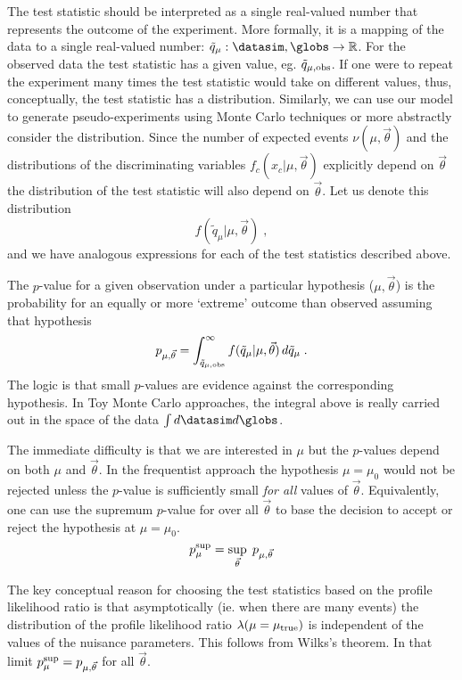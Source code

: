 The test statistic should be interpreted as a single real-valued number that represents the outcome of the experiment.  More formally, it is a mapping of the data to a single real-valued number:  \mbox{$\tilde{q}_\mu: \datasim,\globs \rightarrow \mathbb{R}$}.  For the observed data the test statistic has a given value, eg. $\tilde{q}_{\mu,\rm obs}$.  If one were to repeat the experiment many times the test statistic would take on different values, thus, conceptually, the test statistic has a distribution.  Similarly, we can use our model to generate pseudo-experiments using Monte Carlo techniques or more abstractly consider the distribution.  Since the number of expected events $\nu(\mu,\vec\theta)$ and the distributions of the discriminating variables $f_c(x_c|\mu,\vec\theta)$ explicitly depend on $\vec\theta$ the distribution of the test statistic will also depend on $\vec\theta$.  Let us denote this distribution 
\begin{equation}
f(\tilde{q}_\mu | \mu, \vec\theta) \;,
\end{equation}
and we have analogous expressions for each of the test statistics described above.


The $p$-value for a given observation under a particular hypothesis ($\mu,\vec\theta$) is the probability for an equally or more `extreme' outcome than observed assuming that hypothesis 
\begin{equation}
p_{\mu,\vec\theta} = \int_{\tilde{q}_{\mu,\rm obs}}^\infty f(\tilde{q}_\mu | \mu, \vec\theta) \, d\tilde{q}_\mu\;.
\end{equation}
The logic is that small $p$-values are evidence against the corresponding hypothesis.  In Toy Monte Carlo approaches, the integral above is really carried out in the space of the data $\int d\datasim  d\globs$.


The immediate difficulty is that we are interested in $\mu$ but the $p$-values depend on both $\mu$ and $\vec\theta$.  In the frequentist approach the hypothesis $\mu=\mu_0$ would not be rejected unless the $p$-value is sufficiently small \textit{for all} values of $\vec\theta$.  Equivalently, one can use the supremum $p$-value for over all $\vec\theta$ to base the decision to accept or reject the hypothesis at $\mu=\mu_0$.
\begin{equation}
p^{\rm sup}_{\mu} = \sup_{\vec\theta}\; p_{\mu,\vec\theta} 
\end{equation}


The key conceptual reason for choosing the test statistics based on the profile likelihood ratio is that asymptotically (ie. when there are many events) the distribution of the profile likelihood ratio \mbox{$\lambda(\mu=\mu_{\rm true})$} is  independent of the values of the nuisance parameters.  This follows from Wilks's theorem.  In that limit $p^{\rm sup}_{\mu} =  p_{\mu,\vec\theta}$ for all $\vec\theta$.  


